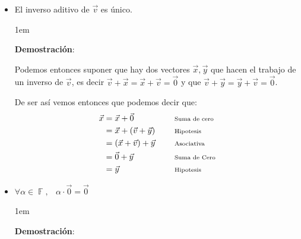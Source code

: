 \documentclass[12pt, fleqn]{report}                             %
\newenvironment{SmallIndentation}[1][0.75em]                    %
        {\begin{adjustwidth}{#1}{}\begin{footnotesize}}             %
        {\end{footnotesize}\end{adjustwidth}}                       %
\DeclareMathOperator \Space     {\quad}                         %
\DeclareMathOperator \MiniSpace {\;}                            %
\newcommand \Remember[1]    {\Space\text{\scriptsize{#1}}}      %
\theoremstyle{break}                                            %
\DeclareMathOperator \GenericField {\mathbb{F}}                 %
\begin{document}
\begin{itemize}
\begin{SmallIndentation}[1em]
                    \end{SmallIndentation}

                \item El inverso aditivo de $\vec{v}$ es único.

                    \begin{SmallIndentation}[1em]
                        \textbf{Demostración}:

                        Podemos entonces suponer que hay dos vectores $\vec{x}, \vec{y}$ que hacen el 
                        trabajo de un inverso de $\vec{v}$, es decir
                        $\vec{v} + \vec{x} = \vec{x} + \vec{v} = \vec{0}$ y que 
                        $\vec{v} + \vec{y} = \vec{y} + \vec{v} = \vec{0}$.

                        De ser así vemos entonces que podemos decir que:
                        \begin{align*}
                            \vec{x} 
                                &= \vec{x} + \vec{0}                &&\Remember{Suma de cero}   \\
                                &= \vec{x} + (\vec{v} + \vec{y})    &&\Remember{Hipotesis}      \\
                                &= (\vec{x} + \vec{v}) + \vec{y}    &&\Remember{Asociativa}     \\
                                &= \vec{0} + \vec{y}                &&\Remember{Suma de Cero}   \\
                                &= \vec{y}                          &&\Remember{Hipotesis}   
                        \end{align*}

                    \end{SmallIndentation}

                \clearpage


                \item $\forall \alpha \in \GenericField, \MiniSpace \alpha \cdot \vec{0} = \vec{0}$

                    \begin{SmallIndentation}[1em]
                        \textbf{Demostración}:


\end{SmallIndentation}
\end{itemize}
\end{document}
